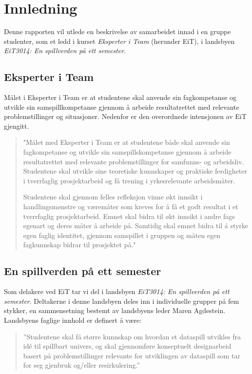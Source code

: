 \section{Innledning} 
Denne rapporten vil utlede en beskrivelse av samarbeidet innad i en gruppe studenter, som et ledd i kurset \emph{Eksperter i Team} (herunder EiT), i landsbyen \emph{EiT3014: En spillverden på ett semester}.

\subsection{Eksperter i Team} Målet i Eksperter i Team er at studentene
skal anvende sin fagkompetanse og utvikle sin samspillkompetanse gjennom
å arbeide resultatrettet med relevante problemstillinger og situasjoner.
Nedenfor er den overordnede intensjonen av EiT gjengitt.

\begin{quotation}"Målet med Eksperter i Team er at studentene både skal anvende
sin fagkompetanse og utvikle sin samspillskompetanse gjennom å arbeide
resultatrettet med relevante problemstillinger for samfunns- og
arbeidsliv. Studentene skal utvikle sine teoretiske kunnskaper og
praktiske ferdigheter i tverrfaglig prosjektarbeid og få trening i
yrkesrelevante arbeidsmåter.

Studentene skal gjennom felles refleksjon vinne økt innsikt i
handlingsmønstre og væremåter som kreves for å få et godt resultat i et
tverrfaglig prosjektarbeid. Emnet skal bidra til økt innsikt i andre
fags egenart og deres måter å arbeide på. Samtidig skal emnet bidra til
å styrke egen faglig identitet, gjennom samspillet i gruppen og måten
egen fagkunnskap bidrar til prosjektet på."
\end{quotation}

\subsection{En spillverden på ett semester} Som delakere ved EiT tar vi
del i landsbyen \emph{EiT3014: En spillverden på ett semester}.
Deltakerne i denne landsbyen deles inn i individuelle grupper på fem
stykker, en sammensetning bestemt av landsbyens leder Maren Agdestein.
Landsbyens faglige innhold er definert å være: 

\begin{quotation}''Studentene skal få større kunnskap om hvordan et dataspill utvikles fra 
idé til spillbart univers, og skal gjennomføre konseptuelt designarbeid 
basert på problemstillinger relevante for utviklingen av dataspill som 
tar for seg gjenbruk og/eller resirkulering.''
\end{quotation}

